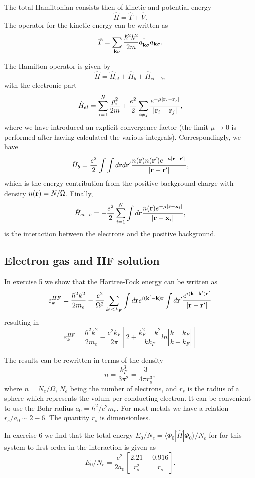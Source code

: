 \documentclass[%
twoside,                 %
final,                   %
10pt]{article}
\begin{document}
\begin{block}{}
The total Hamiltonian consists then of kinetic and potential energy
\[
\hat{H} = \hat{T}+\hat{V}.
\]
The operator for the kinetic energy can be written as
\[
\hat{T}=\sum_{{\bf k}\sigma}\frac{\hbar^2k^2}{2m}a_{{\bf k}\sigma}^{\dagger}a_{{\bf k}\sigma}.
\]

The Hamilton operator is given by
\[
\hat{H}=\hat{H}_{el}+\hat{H}_{b}+\hat{H}_{el-b},
\]
with the electronic part
\[
\hat{H}_{el}=\sum_{i=1}^N\frac{p_i^2}{2m}+\frac{e^2}{2}\sum_{i\ne j}\frac{e^{-\mu |{\bf r}_i-{\bf r}_j|}}{|{\bf r}_i-{\bf r}_j|},
\]
where we have introduced an explicit convergence factor
(the limit $\mu\rightarrow 0$ is performed after having calculated the various integrals).
Correspondingly, we have
\[
\hat{H}_{b}=\frac{e^2}{2}\int\int d{\bf r}d{\bf r}'\frac{n({\bf r})n({\bf r}')e^{-\mu |{\bf r}-{\bf r}'|}}{|{\bf r}-{\bf r}'|},
\]
which is the energy contribution from the positive background charge with density
$n({\bf r})=N/\Omega$. Finally,
\[
\hat{H}_{el-b}=-\frac{e^2}{2}\sum_{i=1}^N\int d{\bf r}\frac{n({\bf r})e^{-\mu |{\bf r}-{\bf x}_i|}}{|{\bf r}-{\bf x}_i|},
\]
is the interaction between the electrons and the positive background.
\end{block}

\subsection{Electron gas and HF solution}
\begin{block}{}
In exercise 5 we show that the Hartree-Fock energy can be written as 
\[
\varepsilon_{k}^{HF}=\frac{\hbar^{2}k^{2}}{2m_e}-\frac{e^{2}}
{\Omega^{2}}\sum_{k'\leq
k_{F}}\int d{\bf r}e^{i({\bf k}'-{\bf k}){\bf r}}\int
d{\bf r'}\frac{e^{i({\bf k}-{\bf k}'){\bf r}'}}
{\vert{\bf r}-{\bf r}'\vert}
\]
resulting in
\[
\varepsilon_{k}^{HF}=\frac{\hbar^{2}k^{2}}{2m_e}-\frac{e^{2}
k_{F}}{2\pi}
\left[
2+\frac{k_{F}^{2}-k^{2}}{kk_{F}}ln\left\vert\frac{k+k_{F}}
{k-k_{F}}\right\vert
\right]
\]

The results can be rewritten in terms of the density
\[
n= \frac{k_F^3}{3\pi^2}=\frac{3}{4\pi r_s^3},
\]
where $n=N_e/\Omega$, $N_e$ being the number of electrons, and $r_s$ is the radius of a sphere which represents the volum per conducting electron.  
It can be convenient to use the Bohr radius $a_0=\hbar^2/e^2m_e$.
For most metals we have a relation $r_s/a_0\sim 2-6$.  The quantity $r_s$ is dimensionless.

In exercise 6 we find that
the total energy
$E_0/N_e=\langle\Phi_{0}|\hat{H}|\Phi_{0}\rangle/N_e$ for
for this system to first order in the interaction is given as 
\[
E_0/N_e=\frac{e^2}{2a_0}\left[\frac{2.21}{r_s^2}-\frac{0.916}{r_s}\right].
\]

\end{block}
\end{document}
